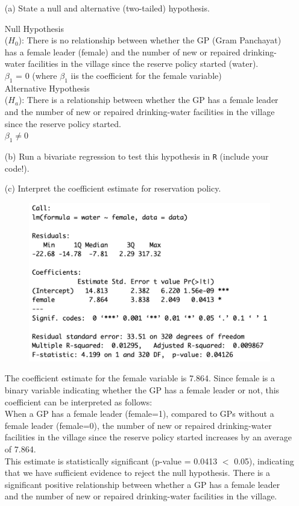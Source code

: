 \documentclass[12pt,letterpaper]{article}
\begin{document}
\newpage
\begin{enumerate}
	\item [(a)] State a null and alternative (two-tailed) hypothesis. 
	
	Null Hypothesis\\
	($H_0$): There is no relationship between whether the GP (Gram Panchayat) has a female leader (female) and the number of new or repaired drinking-water facilities in the village since the reserve policy started (water).\\
	$\beta_1$ = 0 (where $\beta_1$ iis the coefficient for the female variable)\\
	Alternative Hypothesis\\
	($H_a$):  There is a relationship between whether the GP has a female leader and the number of new or repaired drinking-water facilities in the village since the reserve policy started.\\
	$\beta_1 \neq 0$

	\item [(b)] Run a bivariate regression to test this hypothesis in \texttt{R} (include your code!).
	
	
	\newpage
	\item [(c)] Interpret the coefficient estimate for reservation policy. \\
	
\begin{figure}[h]
	\centering
	\includegraphics[width=0.7\linewidth]{"lm output"}
	\caption{}
	\label{fig:lm-output}
\end{figure}

\vspace{1cm}
The coefficient estimate for the female variable is 7.864. Since female is a binary variable indicating whether the GP has a female leader or not, this coefficient can be interpreted as follows:\\
When a GP has a female leader (female=1), compared to GPs without a female leader (female=0), the number of new or repaired drinking-water facilities in the village since the reserve policy started increases by an average of 7.864.\\
This estimate is statistically significant (p-value = 0.0413 $<$ 0.05), indicating that we have sufficient evidence to reject the null hypothesis. There is a significant positive relationship between whether a GP has a female leader and the number of new or repaired drinking-water facilities in the village.

\end{enumerate}
\end{document}
